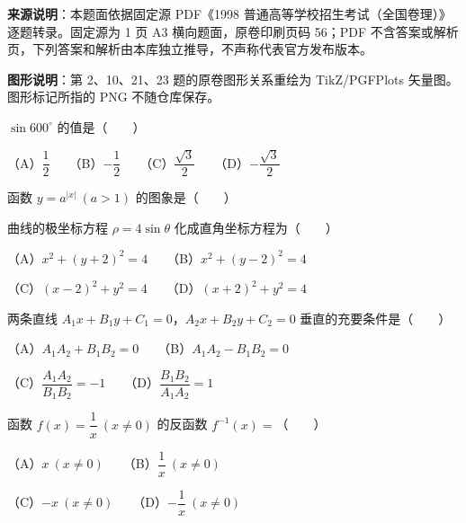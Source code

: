 


\begin{gktip}
\textbf{来源说明}：本题面依据固定源 PDF《1998 普通高等学校招生考试（全国卷理）》逐题转录。固定源为 1 页 A3 横向题面，原卷印刷页码 56；PDF 不含答案或解析页，下列答案和解析由本库独立推导，不声称代表官方发布版本。

\textbf{图形说明}：第 2、10、21、23 题的原卷图形关系重绘为 TikZ/PGFPlots 矢量图。图形标记所指的 PNG 不随仓库保存。
\end{gktip}

\begin{question}
$\sin600^\circ$ 的值是\mbox{（　　）}

（A）$\dfrac12$　　（B）$-\dfrac12$　　（C）$\dfrac{\sqrt3}{2}$　　（D）$-\dfrac{\sqrt3}{2}$

\Needspace{0.4\textheight}
\end{question}
\begin{question}
函数 $y=a^{|x|}\ (a>1)$ 的图象是\mbox{（　　）}
\nopagebreak[4]
\begin{center}\end{center}
\nopagebreak[4]
\end{question}
\begin{question}
曲线的极坐标方程 $\rho=4\sin\theta$ 化成直角坐标方程为\mbox{（　　）}

（A）$x^2+(y+2)^2=4$　　（B）$x^2+(y-2)^2=4$

（C）$(x-2)^2+y^2=4$　　（D）$(x+2)^2+y^2=4$

\end{question}
\begin{question}
两条直线 $A_1x+B_1y+C_1=0$，$A_2x+B_2y+C_2=0$ 垂直的充要条件是\mbox{（　　）}

（A）$A_1A_2+B_1B_2=0$　　（B）$A_1A_2-B_1B_2=0$

（C）$\dfrac{A_1A_2}{B_1B_2}=-1$　　（D）$\dfrac{B_1B_2}{A_1A_2}=1$

\end{question}
\begin{question}
函数 $f(x)=\dfrac1x\ (x\neq0)$ 的反函数 $f^{-1}(x)=$\mbox{（　　）}

（A）$x\ (x\neq0)$　　（B）$\dfrac1x\ (x\neq0)$

（C）$-x\ (x\neq0)$　　（D）$-\dfrac1x\ (x\neq0)$

\end{question}
